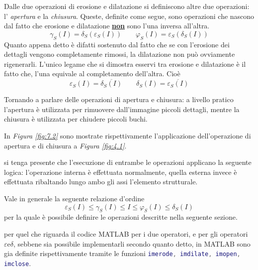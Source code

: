 \documentclass{subfiles}
\begin{document}
Dalle due operazioni di erosione e dilatazione si definiscono altre due operazioni: l' \emph{apertura} e la \emph{chiusura}.
Queste, definite come segue, sono operazioni che nascono dal fatto che erosione e dilatazione \underline{\textbf{non}} sono l'una inversa all'altra.
\[
    \gamma_{S}(I) = \delta_{S}(\varepsilon_{S}(I)) \qquad \varphi_{S}(I) = \varepsilon_{S}(\delta_{S}(I))
\]
Quanto appena detto è difatti sostenuto dal fatto che se con l'erosione dei dettagli vengono completamente rimossi, la dilatazione non può ovviamente rigenerarli.
L'unico legame che si dimostra esservi tra erosione e dilatazione è il fatto che, l'una equivale al completamento dell'altra. Cioè
\[
    \varepsilon_{S}(I) = \overline{\delta_{S}(I)} \qquad \delta_{S}(I) = \overline{\varepsilon_{S}(I)}
\]

Tornando a parlare delle operazioni di apertura e chiusura: a livello pratico l'apertura è utilizzata per rimuovere dall'immagine piccoli dettagli,
mentre la chiusura è utilizzata per chiudere piccoli buchi.


In \emph{Figura \ref{fig:7.2}} sono mostrate rispettivamente l'applicazione dell'operazione di apertura e di chiusura a \emph{Figura \ref{fig:4.1}}.

\begin{Remark*}
    si tenga presente che l'esecuzione di entrambe le operazioni applicano la seguente logica: l'operazione interna è effettuata normalmente,
    quella esterna invece è effettuata ribaltando lungo ambo gli assi l'elemento strutturale.
\end{Remark*}

Vale in generale la seguente relazione d'ordine
\[
    \varepsilon_{S}(I) \le \gamma_{S}(I) \le I \le \varphi_{S}(I) \le \delta_{S}(I)
\]
per la quale è possibile definire le operazioni descritte nella seguente sezione.

\begin{Note*}
    per quel che riguarda il codice MATLAB per i due operatori, e per gli operatori \(\varepsilon \text{e} \delta\), sebbene sia possibile implementarli secondo quanto detto,
    in MATLAB sono gia definite rispettivamente tramite le funzioni \lstinline[language = MATLAB]{imerode, imdilate, imopen, imclose}.
\end{Note*}
\end{document}
